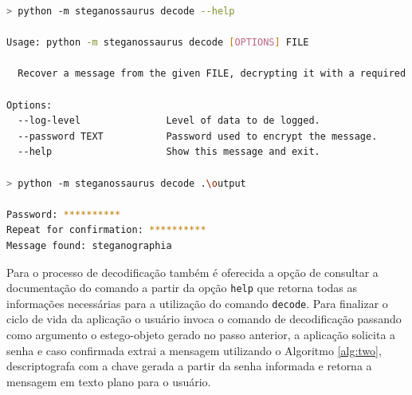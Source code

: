 \vspace{10mm}

\begin{lstlisting}[language=bash]
> python -m steganossaurus decode --help

Usage: python -m steganossaurus decode [OPTIONS] FILE

  Recover a message from the given FILE, decrypting it with a required password.

Options:
  --log-level               Level of data to de logged.
  --password TEXT           Password used to encrypt the message.
  --help                    Show this message and exit.

> python -m steganossaurus decode .\output

Password: **********
Repeat for confirmation: **********
Message found: steganographia
\end{lstlisting}

\vspace{10mm}

Para o processo de decodificação também é oferecida a opção de consultar a documentação do comando a partir da opção \texttt{\-\-help} que retorna todas as informações necessárias para a utilização do comando \texttt{decode}. Para finalizar o ciclo de vida da aplicação o usuário invoca o comando de decodificação passando como argumento o estego-objeto gerado no passo anterior, a aplicação solicita a senha e caso confirmada extrai a mensagem utilizando o Algoritmo \ref{alg:two}, descriptografa com a chave gerada a partir da senha informada e retorna a mensagem em texto plano para o usuário.


